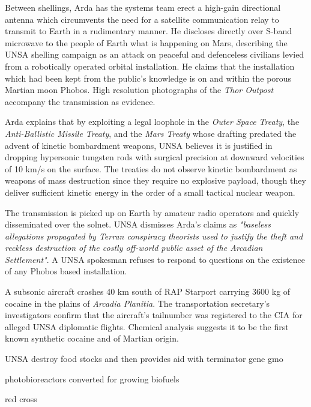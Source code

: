 Between shellings, Arda has the systems team erect a high-gain directional antenna which circumvents the need for a satellite communication relay to transmit to Earth in a rudimentary manner. He discloses directly over S-band microwave to the people of Earth what is happening on Mars, describing the UNSA shelling campaign as an attack on peaceful and defenceless civilians levied from a robotically operated orbital installation. He claims that the installation which had been kept from the public's knowledge is on and within the porous Martian moon Phobos. High resolution photographs of the {\it Thor Outpost} accompany the transmission as evidence.

Arda explains that by exploiting a legal loophole in the {\it Outer Space Treaty}, the {\it Anti-Ballistic Missile Treaty}, and the {\it Mars Treaty} whose drafting predated the advent of kinetic bombardment weapons, UNSA believes it is justified in dropping hypersonic tungsten rods with surgical precision at downward velocities of 10 km/s on the surface. The treaties do not observe kinetic bombardment as weapons of mass destruction since they require no explosive payload, though they deliver sufficient kinetic energy in the order of a small tactical nuclear weapon.

The transmission is picked up on Earth by amateur radio operators and quickly disseminated over the solnet. UNSA dismisses Arda's claims as {\it "baseless allegations propagated by Terran conspiracy theorists used to justify the theft and reckless destruction of the costly off-world public asset of the Arcadian Settlement"}. A UNSA spokesman refuses to respond to questions on the existence of any Phobos based installation.
\StopTimelineDate

A subsonic aircraft crashes 40 km south of RAP Starport carrying 3600 kg of cocaine in the plains of {\it Arcadia Planitia}. The transportation secretary's investigators confirm that the aircraft's tailnumber was registered to the CIA for alleged UNSA diplomatic flights. Chemical analysis suggests it to be the first known synthetic cocaine and of Martian origin.
\StopTimelineDate

UNSA destroy food stocks and then provides aid with terminator gene gmo

photobioreactors converted for growing biofuels

red cross

\stoplines

\StopChapter

